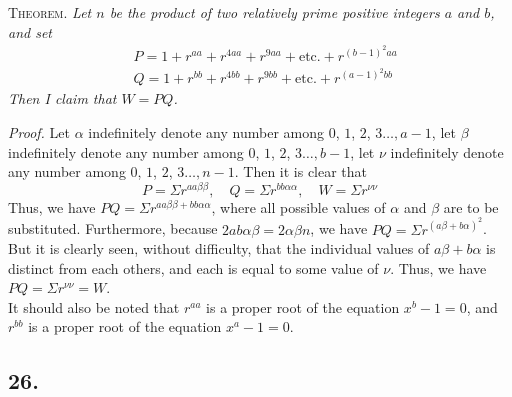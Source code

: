 \documentclass[twoside,12pt]{memoir}
\begin{document}
\textsc{Theorem.} \textit{Let \(n\) be the product of two relatively prime positive integers \(a\) and \(b\), and set}
\[\begin{aligned}
& P=1+r^{a a}+r^{4 a a}+r^{9 a a}+\text{etc{.}}+r^{(b-1)^{2} a a} \\
& Q=1+r^{b b}+r^{4 b b}+r^{9 b b}+\text{etc{.}}+r^{(a-1)^{2} b b}
\end{aligned}\]
\textit{Then I claim that \(W=PQ\).}

\textit{Proof.} Let \(\alpha\) indefinitely denote any number among \(0\), \(1\), \(2\), \(3\ldots, a-1\), let \(\beta\) indefinitely denote any number among \(0\), \(1\), \(2\), \(3\ldots, b-1\), let \(\nu\) indefinitely denote any number among \(0\), \(1\), \(2\), \(3\ldots, n-1\). Then it is clear that
\[P=\Sigma r^{a a \beta \beta}, \quad Q=\Sigma r^{b b \alpha \alpha}, \quad W=\Sigma r^{\nu \nu}\]
Thus, we have \(PQ=\Sigma r^{a a \beta \beta +b b \alpha \alpha}\), where all possible values of \(\alpha\) and \(\beta\) are to be substituted.  Furthermore, because \(2ab\alpha\beta=2\alpha\beta n\), we have \(PQ=\Sigma r^{(a \beta+b \alpha)^{2}}\). But it is clearly seen, without difficulty, that the individual values of \(a \beta+b \alpha\) is distinct from each others, and each is equal to some value of \(\nu\). Thus, we have \(PQ=\Sigma r^{\nu \nu}=W\).\\

It should also be noted that \(r^{a a}\) is a proper root of the equation \(x^{b}-1=0\), and \(r^{b b}\) is a proper root of the equation \(x^{a}-1=0\).\pagebreak%

\subsection*{26.}
\end{document}
